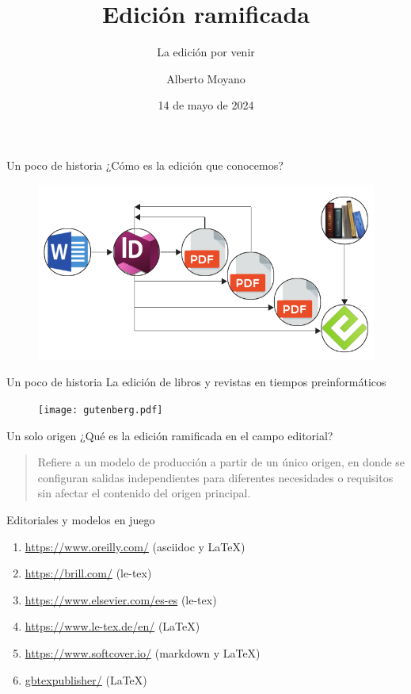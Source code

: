 \documentclass[14pt,aspectratio=169]{beamer}
\title{Edición ramificada}
\subtitle{La edición por venir}
\author{Alberto Moyano}
\date{14 de mayo de 2024}
\institute{\url{https://gitlab.com/alberto.alejandro.moyano/CHARLAMATE}}
\begin{document}
	\begin{frame}
		\titlepage
	\end{frame}

\begin{frame}{Un poco de historia}
	¿Cómo es la edición que conocemos?

	\begin{figure}
	\centering
	\includegraphics[width=.7\textwidth]{ciclos.pdf}
\end{figure}
\end{frame}

\begin{frame}{Un poco de historia}
	La edición de libros y revistas en tiempos preinformáticos
	\begin{figure}
		\centering
		\texttt{[image: gutenberg.pdf]}
	\end{figure}
\end{frame}

\begin{frame}{Un solo origen}
	¿Qué es la edición ramificada en el campo editorial?\vspace{14pt}

	\begin{quote}
	Refiere a un modelo de producción a partir de un único origen, en donde se configuran salidas independientes para diferentes necesidades o requisitos sin afectar el contenido del origen principal.
	\end{quote}
\end{frame}

\begin{frame}{Editoriales y modelos en juego}
	\begin{enumerate}
		\item \url{https://www.oreilly.com/} (asciidoc y LaTeX)
		\item \url{https://brill.com/} (le-tex)
		\item \url{https://www.elsevier.com/es-es} (le-tex)
		\item \url{https://www.le-tex.de/en/} (LaTeX)
		\item \url{https://www.softcover.io/} (markdown y LaTeX)
		\item \url{gbtexpublisher/} (LaTeX)
	\end{enumerate}
\end{frame}
\end{document}
